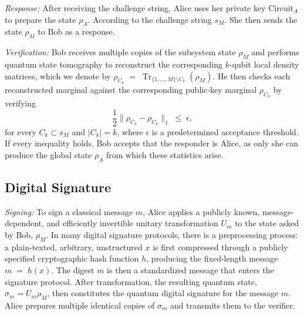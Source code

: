 \documentclass[a0,portrait]{a0poster}
\theoremstyle{definition}
\begin{document}
\begin{multicols}{2}
\textit{Response:}  
After receiving the challenge string, Alice uses her private key $\text{Circuit}_A$ to prepare the state $\rho_A$. According to the challenge string $s_M$. She then sends the state $\rho_M$ to Bob as a response.

\textit{Verification:}  
Bob receives multiple copies of the subsystem state $\rho_M$ and performs quantum state tomography to reconstruct the corresponding $k$-qubit local density matrices, which we denote by $\rho_{C_k} \;=\;\operatorname{Tr}_{\{1,\ldots,M\}\setminus C_k}(\rho_M)$.
He then checks each reconstructed marginal against the corresponding public‐key marginal \(\rho_{C_k}\) by verifying
\[
\frac{1}{2}\bigl\|\rho_{C_k} - \rho_{C_k}\bigr\|_1 \;\le\;\epsilon,
\]
for every $C_k\subset s_M$ and $|C_k| = k$, where $\epsilon$ is a predetermined acceptance threshold. If every inequality holds,
Bob accepts that the responder is Alice, as only she can produce the global state $\rho_A$ from which these statistics arise.


\subsection*{Digital Signature 
}

\textit{Signing:}  
To sign a classical message $m$, Alice applies a publicly known, message-dependent, and efficiently invertible unitary transformation $U_m$ to the state asked by Bob, $\rho_M$. In many digital signature protocols, there is a preprocessing process: a plain-texted, arbitrary, unstructured \(x\) is first compressed through a publicly specified cryptographic hash function \(h\), producing the fixed-length message
\(
  m \;=\; h(x).
\)
The digest \(m\) is then a standardized message that enters the signature protocol. After transformation, the resulting quantum state,
$\sigma_m=U_m\rho_M$, then constitutes the quantum digital signature for the message $m$.  Alice prepares multiple identical copies of $\sigma_m$ and transmits them to the verifier. 


\end{multicols}
\end{document}
